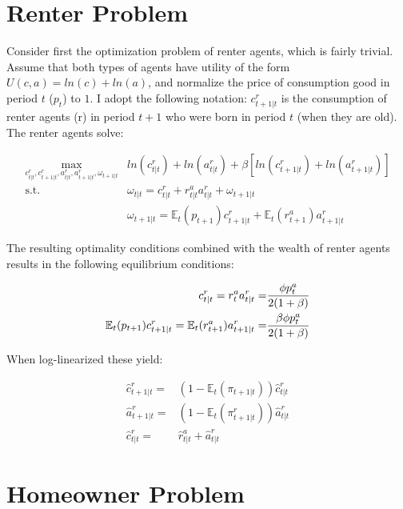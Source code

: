 \documentclass{article}
\begin{document}
\section{Renter Problem}

Consider first the optimization problem of renter agents, which is fairly trivial. Assume that both types of agents have utility of the form $U(c, a) = ln(c) + ln(a)$, and normalize the price of consumption good in period $t$ ($p_t$) to $1$. I adopt the following notation: $c^r_{t+1|t}$ is the consumption of renter agents (r) in period $t+1$ who were born in period $t$ (when they are old). The renter agents solve:

\begin{align}
    \underset{c^r_{t|t}, c^r_{t+1|t}, a^r_{t|t}, a^r_{t+1|t}, \omega_{t+1|t}}{\max} &ln(c^r_{t|t}) + ln(a^r_{t|t}) + \beta[ln(c^r_{t+1|t}) + ln(a^r_{t+1|t})] \nonumber \\
    \text{s.t. }& \omega_{t|t} = c^r_{t|t} + r_{t|t}^a a^r_{t|t} + \omega_{t+1|t} \nonumber \\
    & \omega_{t+1|t} = \mathbb{E}_t(p_{t+1})c^r_{t+1|t} + \mathbb{E}_t(r^a_{t+1})a^r_{t+1|t}
\end{align}

The resulting optimality conditions combined with the wealth of renter agents results in the following equilibrium conditions:

\begin{align}
    c^r_{t|t} = r^a_t a^r_{t|t} =& \frac{\phi p^a_t}{2(1+\beta)} \label{renter_optimal_{t|t}} \\
    \mathbb{E}_t(p_{t+1}) c^r_{t+1|t} = \mathbb{E}_t(r^a_{t+1}) a^r_{t+1|t} =& \frac{\beta \phi p^a_t}{2(1+\beta)} \label{renter_optimal_{t|t}1}
\end{align}

When log-linearized these yield:

\begin{align}
    \hat{c}^r_{t+1|t} =& (1-\mathbb{E}_t(\pi_{t+1|t}))\hat{c}^r_{t|t} \\
    \hat{a}^r_{t+1|t} =& (1-\mathbb{E}_t(\pi^r_{t+1|t}))\hat{a}^r_{t|t} \\
    \hat{c}^r_{t|t} =& \hat{r}^a_{t|t} + \hat{a}^r_{t|t}
\end{align}

\section{Homeowner Problem}
\end{document}
